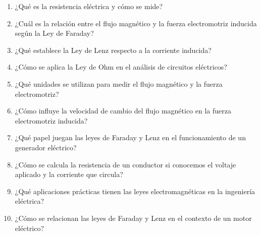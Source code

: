 \documentclass[../main]{subfiles}
\begin{document}
\begin{enumerate}
    \item ¿Qué es la resistencia eléctrica y cómo se mide?
    \item ¿Cuál es la relación entre el flujo magnético y la fuerza electromotriz inducida según la Ley de Faraday?
    \item ¿Qué establece la Ley de Lenz respecto a la corriente inducida?
    \item ¿Cómo se aplica la Ley de Ohm en el análisis de circuitos eléctricos?
    \item ¿Qué unidades se utilizan para medir el flujo magnético y la fuerza electromotriz?
    \item ¿Cómo influye la velocidad de cambio del flujo magnético en la fuerza electromotriz inducida?
    \item ¿Qué papel juegan las leyes de Faraday y Lenz en el funcionamiento de un generador eléctrico?
    \item ¿Cómo se calcula la resistencia de un conductor si conocemos el voltaje aplicado y la corriente que circula?
    \item ¿Qué aplicaciones prácticas tienen las leyes electromagnéticas en la ingeniería eléctrica?
    \item ¿Cómo se relacionan las leyes de Faraday y Lenz en el contexto de un motor eléctrico?
\end{enumerate}
\end{document}
